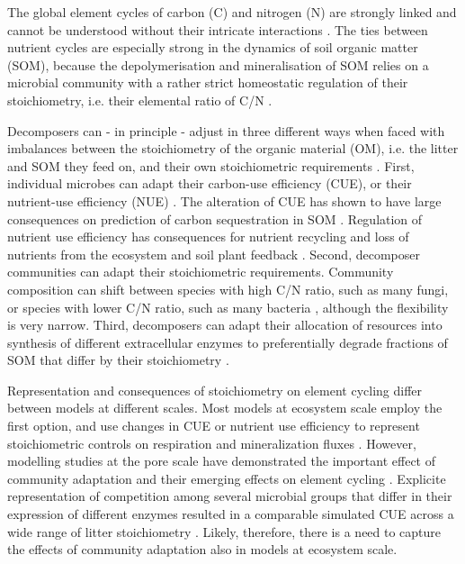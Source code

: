 
\introduction 
The global element cycles of carbon (C) and nitrogen (N) are strongly linked
and cannot be understood without their intricate interactions 
\citep{Thornton07,Janssens10, Zaehle11}. 
The ties between nutrient cycles are especially strong
in the dynamics of soil organic matter (SOM), because the depolymerisation and mineralisation of SOM relies on a microbial community with a rather strict homeostatic regulation of their stoichiometry, i.e. their elemental ratio of C/N \citep{Sterner02, Zechmeister15}.


Decomposers can - in principle - adjust in three different ways when faced with imbalances between the stoichiometry of the organic material (OM), i.e. the litter and SOM they
feed on, and their own stoichiometric requirements \citep{Mooshammer14}.
First, individual microbes can adapt their carbon-use efficiency (CUE), or their nutrient-use
efficiency (NUE) \citep{Sinsabaugh13}. The alteration of CUE has shown to have
large consequences on prediction of carbon sequestration in SOM
\citep{Allison14a, Wieder13}.
Regulation of nutrient use efficiency has consequences for nutrient recycling and loss of nutrients
from the ecosystem \citep{Mooshammer14a} and soil plant feedback
\citep{Rastetter11}.
Second, decomposer communities can adapt their stoichiometric
requirements. Community composition can shift between species with high C/N
ratio, such as many fungi, or species with lower C/N ratio, such as many
bacteria \citep{Cleveland07, Xu13}, although the flexibility is very narrow.
Third, decomposers can adapt their allocation of resources into
synthesis of different extracellular enzymes to preferentially degrade
fractions of SOM that differ by their stoichiometry \citep{Moorhead12}.

Representation and consequences of stoichiometry on element cycling differ
between models at different scales. Most models at ecosystem scale employ the
first option, and use changes in CUE or nutrient use efficiency to represent stoichiometric controls
on respiration and mineralization fluxes \citep{Manzoni08}. However, modelling
studies at the pore scale have demonstrated the important effect of community
adaptation and their emerging effects on element cycling \citep{Allison05,
Resat11, Wang13}. Explicite representation of competition among several
microbial groups that differ in their expression of different enzymes resulted in a
comparable simulated CUE across a wide range of litter stoichiometry
\citep{Kaiser14}. Likely, therefore, there is a need to capture the effects of
community adaptation also in models at ecosystem scale.


